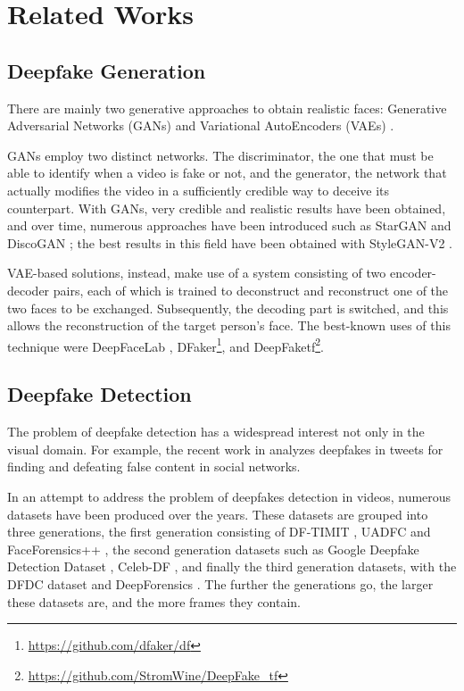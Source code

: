 \documentclass[runningheads]{llncs}
\begin{document}
\section{Related Works}
\subsection{Deepfake Generation}
There are mainly two generative approaches to obtain realistic faces: Generative Adversarial Networks (GANs) \cite{goodfellow2014generative} and Variational AutoEncoders (VAEs) \cite{kingma2014autoencoding}. 

GANs employ two distinct networks. The discriminator, the one that must be able to identify when a video is fake or not, and the generator, the network that actually modifies the video in a sufficiently credible way to deceive its counterpart.
With GANs, very credible and realistic results have been obtained, and over time, numerous approaches have been introduced such as StarGAN \cite{choi2018stargan} and DiscoGAN \cite{kim2017learning}; the best results in this field have been obtained with StyleGAN-V2 \cite{karras2020analyzing}.

VAE-based solutions, instead, make use of a system consisting of two encoder-decoder pairs, each of which is trained to deconstruct and reconstruct one of the two faces to be exchanged. Subsequently, the decoding part is switched, and this allows the reconstruction of the target person's face. The best-known uses of this technique were DeepFaceLab \cite{deepfacelab}, DFaker\footnote{\url{https://github.com/dfaker/df}}, and DeepFaketf\footnote{\url{https://github.com/StromWine/DeepFake_tf}}.

\subsection{Deepfake Detection}
The problem of deepfake detection has a widespread interest not only in the visual domain. For example, the recent work in \cite{fagni2021tweepfake} analyzes deepfakes in tweets for finding and defeating false content in social networks.

In an attempt to address the problem of deepfakes detection in videos, numerous datasets have been produced over the years. These datasets are grouped into three generations, the first generation consisting of DF-TIMIT \cite{korshunov2018deepfakes}, UADFC \cite{yang2019exposing} and FaceForensics++ \cite{rossler2019faceforensics}, the second generation datasets such as Google Deepfake Detection Dataset \cite{googledf}, Celeb-DF \cite{li2020celebdf}, and finally the third generation datasets, with the DFDC dataset \cite{dolhansky2020deepfake} and DeepForensics \cite{jiang2020deeperforensics10}. The further the generations go, the larger these datasets are, and the more frames they contain.
\end{document}
